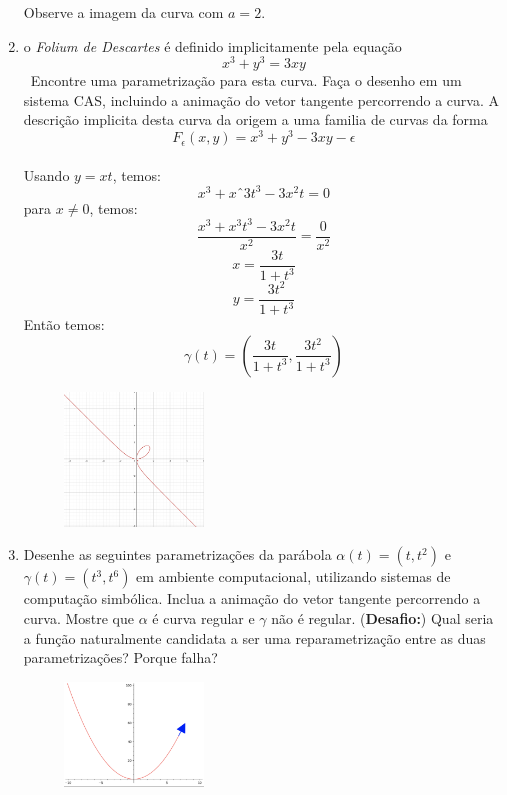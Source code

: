 \documentclass{article}
\begin{document}
\begin{enumerate}
\begin{figure}[!h]
                \label{fig:exercício 4}
            \end{figure} 
            Observe a imagem da curva com $a = 2$.
    \item o \textit{Folium de Descartes} é definido implicitamente pela equação \
        $$x^3+y^3 = 3xy$$ \
        Encontre uma parametrização para esta curva. Faça o desenho em um sistema CAS, incluindo a animação do vetor tangente percorrendo a curva. A descrição implicita desta curva da origem a uma familia de curvas da forma \
        $$F_{\epsilon}(x, y) = x^3 + y^3 - 3xy - \epsilon$$ \
        \\
        Usando $y = xt$, temos:
        $$x^3+xˆ3t^3-3x^2t = 0$$
        para $x \neq 0$, temos:
        $$\frac{x^3+x^3t^3-3x^2t}{x^2} = \frac{0}{x^2}$$
        $$x = \frac{3t}{1+t^3}$$
        $$y = \frac{3t^2}{1+t^3}$$
        Então temos:
        $$\gamma(t) = (\frac{3t}{1+t^3}, \frac{3t^2}{1+t^3})$$
        \begin{figure}[!h]
            \centering
            \includegraphics[width=0.35\textwidth]{imgs/folium_de_descartes.png}
            \label{fig:exercício 5}
        \end{figure}
    \item Desenhe as seguintes parametrizações da parábola $\alpha(t) = (t,t^2)$ e $\gamma(t) = (t^3,t^6)$ em ambiente computacional, utilizando sistemas de computação simbólica. Inclua a animação do vetor tangente percorrendo a curva. Mostre que $\alpha$ é curva regular e $\gamma$ não é regular. (\textbf{Desafio:}) Qual seria a função naturalmente candidata a ser uma reparametrização entre as duas parametrizações? Porque falha? \
        \begin{figure}[!h]
            \centering
            \includegraphics[width=0.35\textwidth]{imgs/curva2.png}

\end{figure}
\end{enumerate}
\end{document}
